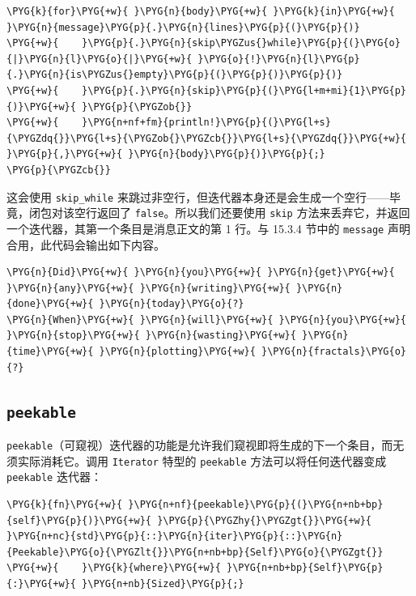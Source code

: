 \begin{Verbatim}[commandchars=\\\{\},breaklines=true,breakanywhere=true,fontsize=\codefont,xleftmargin=17bp]
\PYG{k}{for}\PYG{+w}{ }\PYG{n}{body}\PYG{+w}{ }\PYG{k}{in}\PYG{+w}{ }\PYG{n}{message}\PYG{p}{.}\PYG{n}{lines}\PYG{p}{(}\PYG{p}{)}
\PYG{+w}{    }\PYG{p}{.}\PYG{n}{skip\PYGZus{}while}\PYG{p}{(}\PYG{o}{|}\PYG{n}{l}\PYG{o}{|}\PYG{+w}{ }\PYG{o}{!}\PYG{n}{l}\PYG{p}{.}\PYG{n}{is\PYGZus{}empty}\PYG{p}{(}\PYG{p}{)}\PYG{p}{)}
\PYG{+w}{    }\PYG{p}{.}\PYG{n}{skip}\PYG{p}{(}\PYG{l+m+mi}{1}\PYG{p}{)}\PYG{+w}{ }\PYG{p}{\PYGZob{}}
\PYG{+w}{    }\PYG{n+nf+fm}{println!}\PYG{p}{(}\PYG{l+s}{\PYGZdq{}}\PYG{l+s}{\PYGZob{}\PYGZcb{}}\PYG{l+s}{\PYGZdq{}}\PYG{+w}{ }\PYG{p}{,}\PYG{+w}{ }\PYG{n}{body}\PYG{p}{)}\PYG{p}{;}
\PYG{p}{\PYGZcb{}}
\end{Verbatim}

这会使用 \texttt{skip\_while} 来跳过非空行，但迭代器本身还是会生成一个空行——毕竟，闭包对该空行返回了 \texttt{false}。所以我们还要使用 \texttt{skip} 方法来丢弃它，并返回一个迭代器，其第一个条目是消息正文的第 1 行。与 15.3.4 节中的 \texttt{message} 声明合用，此代码会输出如下内容。

\begin{Verbatim}[commandchars=\\\{\},breaklines=true,breakanywhere=true,fontsize=\codefont,xleftmargin=17bp]
\PYG{n}{Did}\PYG{+w}{ }\PYG{n}{you}\PYG{+w}{ }\PYG{n}{get}\PYG{+w}{ }\PYG{n}{any}\PYG{+w}{ }\PYG{n}{writing}\PYG{+w}{ }\PYG{n}{done}\PYG{+w}{ }\PYG{n}{today}\PYG{o}{?}
\PYG{n}{When}\PYG{+w}{ }\PYG{n}{will}\PYG{+w}{ }\PYG{n}{you}\PYG{+w}{ }\PYG{n}{stop}\PYG{+w}{ }\PYG{n}{wasting}\PYG{+w}{ }\PYG{n}{time}\PYG{+w}{ }\PYG{n}{plotting}\PYG{+w}{ }\PYG{n}{fractals}\PYG{o}{?}
\end{Verbatim}

\subsection{\texttt{peekable}}

\texttt{peekable}（可窥视）迭代器的功能是允许我们窥视即将生成的下一个条目，而无须实际消耗它。调用 \texttt{Iterator} 特型的 \texttt{peekable} 方法可以将任何迭代器变成 \texttt{peekable} 迭代器：

\begin{Verbatim}[commandchars=\\\{\},breaklines=true,breakanywhere=true,fontsize=\codefont,xleftmargin=17bp]
\PYG{k}{fn}\PYG{+w}{ }\PYG{n+nf}{peekable}\PYG{p}{(}\PYG{n+nb+bp}{self}\PYG{p}{)}\PYG{+w}{ }\PYG{p}{\PYGZhy{}\PYGZgt{}}\PYG{+w}{ }\PYG{n+nc}{std}\PYG{p}{::}\PYG{n}{iter}\PYG{p}{::}\PYG{n}{Peekable}\PYG{o}{\PYGZlt{}}\PYG{n+nb+bp}{Self}\PYG{o}{\PYGZgt{}}
\PYG{+w}{    }\PYG{k}{where}\PYG{+w}{ }\PYG{n+nb+bp}{Self}\PYG{p}{:}\PYG{+w}{ }\PYG{n+nb}{Sized}\PYG{p}{;}
\end{Verbatim}

